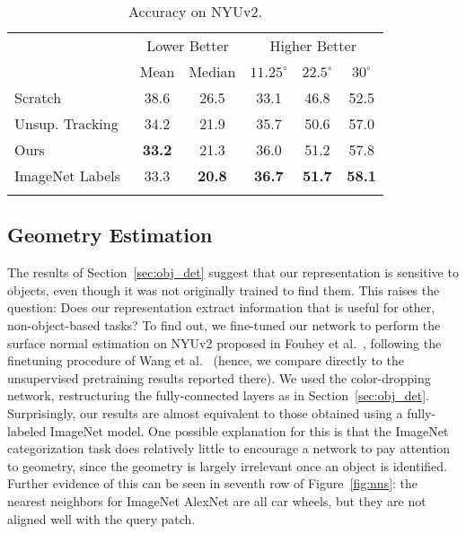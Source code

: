 \documentclass[10pt,twocolumn,letterpaper]{article}
\begin{document}
\begin{table}

\setlength{\tabcolsep}{3pt}
\center
{}
\begin{tabular}{l c c c c c}
\Xhline{2\arrayrulewidth}
 &\multicolumn{2}{c}{Lower Better} & \multicolumn{3}{c}{Higher Better}\\
& Mean & Median & $11.25^{\circ}$ & $22.5^{\circ}$ & $30^{\circ}$\\
\hline
Scratch & 38.6 & 26.5 & 33.1 & 46.8 & 52.5 \\
Unsup. Tracking~\cite{wang2015unsupervised} & 34.2 & 21.9 & 35.7 & 50.6 & 57.0 \\
Ours & \textbf{33.2} & 21.3 & 36.0 & 51.2 & 57.8 \\
ImageNet Labels & 33.3 & \textbf{20.8} & \textbf{36.7} & \textbf{51.7} & \textbf{58.1} \\
\Xhline{2\arrayrulewidth}
\end{tabular}
\vspace{.05cm}
\caption{Accuracy on NYUv2.}
\label{tab:surf_norm}
\vspace{-.25cm}

\end{table}

\vspace{-0.05in}
\subsection{Geometry Estimation}
\vspace{-0.05in}

The results of Section~\ref{sec:obj_det} suggest that our representation is sensitive 
to objects, even though it was not originally trained to find them.  This raises the question:
Does our representation extract information that is useful for other, non-object-based tasks?
To find out, we fine-tuned our network to perform the surface normal estimation on NYUv2 proposed in Fouhey et al.~\cite{Fouhey13a}, following the finetuning procedure of Wang et al.~\cite{wang2015unsupervised} (hence, we compare directly to the unsupervised pretraining results
reported there).  We used the color-dropping network, restructuring the fully-connected
layers as in Section~\ref{sec:obj_det}.  Surprisingly, our results are almost equivalent to
those obtained using a fully-labeled ImageNet model.
One possible explanation for this is that the ImageNet categorization task does relatively
little to encourage a network to pay attention to geometry, since the geometry is largely
irrelevant once an object is identified.  Further evidence of this can be seen in seventh row of
Figure~\ref{fig:nns}: the nearest neighbors for ImageNet AlexNet are all car wheels, but they are
not aligned well with the query patch.
\end{document}
